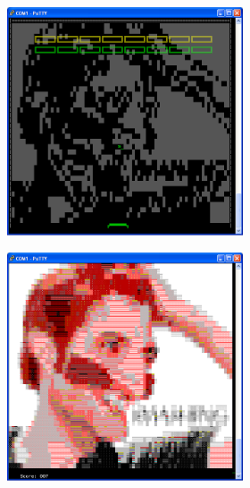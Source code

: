 \begin{figure}
\begin{subfigure}[t]{\columnwidth}
\begin{subfigure}{0.3\linewidth}
		\end{subfigure}
		\begin{subfigure}{0.3\linewidth}
			\includegraphics[scale=0.3]{pictures/level_2.PNG}
		\end{subfigure}
	\end{subfigure}
	\begin{subfigure}[c]{\columnwidth}
		\center
		\begin{subfigure}{0.3\linewidth}
			\includegraphics[scale=0.3]{pictures/level_2_complete.PNG}

\end{subfigure}
\end{subfigure}
\end{figure}
